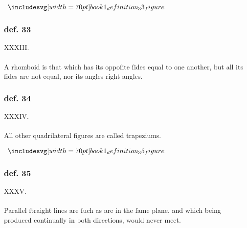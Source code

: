 \hfill

\begin{minipage}{0.33\textwidth}
    \begin{center}
        $\img[0][0][70]{book1_definition_33_figure}$
    \end{center}
\end{minipage}%
\begin{minipage}{0.67\textwidth}
    \subsubsection{def. 33}
    \begin{center}
        XXXIII.\label{book1def33}\\
        \hfill\\
        A rhomboid is that which has its oppoſite ſides equal to one another, but all its ſides are not equal, nor its angles right angles.
    \end{center}
\end{minipage}

\hfill

\begin{minipage}{0.33\textwidth}
    \phantom{}
\end{minipage}%
\begin{minipage}{0.67\textwidth}
    \subsubsection{def. 34}
    \begin{center}
        XXXIV.\label{book1def34}\\
        \hfill\\
        All other quadrilateral figures are called trapeziums.\\
    \end{center}
\end{minipage}

\hfill

\begin{minipage}{0.33\textwidth}
    \begin{center}
        $\img[0][0][70]{book1_definition_35_figure}$
    \end{center}
\end{minipage}%
\begin{minipage}{0.67\textwidth}
    \subsubsection{def. 35}
    \begin{center}
        XXXV.\label{book1def35}\\
        \hfill\\
        Parallel ſtraight lines are ſuch as are in the ſame plane, and which being produced continually in both directions, would never meet.
    \end{center}
\end{minipage}

